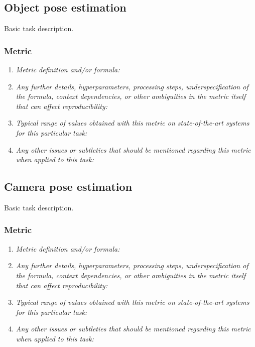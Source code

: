 \documentclass[a4paper,11pt]{article}
\begin{document}
\subsection{Object pose estimation}
    Basic task description.
    \subsubsection{Metric}
        \begin{enumerate}[label=\alph*.]
            \item \textit{Metric definition and/or formula:}
            \bigskip
            \item \textit{Any further details, hyperparameters, processing steps, underspecification of the formula, context dependencies, or other ambiguities in the metric itself that can affect reproducibility:}
            \bigskip
            \item \textit{Typical range of values obtained with this metric on state-of-the-art systems for this particular task:}
            \bigskip
            \item \textit{Any other issues or subtleties that should be mentioned regarding this metric when applied to this task:}
            \bigskip
        \end{enumerate}

\subsection{Camera pose estimation}
    Basic task description.
    \subsubsection{Metric}
        \begin{enumerate}[label=\alph*.]
            \item \textit{Metric definition and/or formula:}
            \bigskip
            \item \textit{Any further details, hyperparameters, processing steps, underspecification of the formula, context dependencies, or other ambiguities in the metric itself that can affect reproducibility:}
            \bigskip
            \item \textit{Typical range of values obtained with this metric on state-of-the-art systems for this particular task:}
            \bigskip
            \item \textit{Any other issues or subtleties that should be mentioned regarding this metric when applied to this task:}
            \bigskip
        \end{enumerate}
\end{document}

